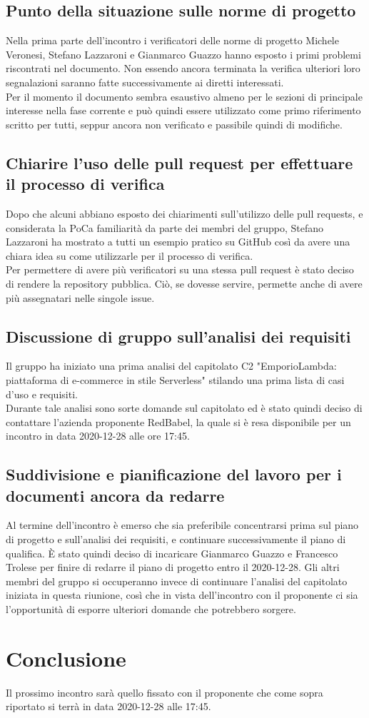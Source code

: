 \subsection{Punto della situazione sulle norme di progetto} 
Nella prima parte dell'incontro i verificatori delle norme di progetto Michele Veronesi, Stefano Lazzaroni e Gianmarco Guazzo hanno esposto i primi problemi riscontrati nel documento. Non essendo ancora terminata la verifica ulteriori loro segnalazioni saranno fatte successivamente ai diretti interessati.\\
Per il momento il documento sembra esaustivo almeno per le sezioni di principale interesse nella fase corrente e può quindi essere utilizzato come primo riferimento scritto per tutti, seppur ancora non verificato e passibile quindi di modifiche.

\subsection{Chiarire l'uso delle pull request per effettuare il processo di verifica}
Dopo che alcuni abbiano esposto dei chiarimenti sull'utilizzo delle pull requests, e considerata la PoCa familiarità da parte dei membri del gruppo, Stefano Lazzaroni ha mostrato a tutti un esempio pratico su GitHub così da avere una chiara idea su come utilizzarle per il processo di verifica.\\
Per permettere di avere più verificatori su una stessa pull request è stato deciso di rendere la repository pubblica. Ciò, se dovesse servire, permette anche di avere più assegnatari nelle singole issue.

\subsection{Discussione di gruppo sull'analisi dei requisiti}
Il gruppo ha iniziato una prima analisi del capitolato C2 "EmporioLambda: piattaforma di e-commerce in stile Serverless" stilando una prima lista di casi d'uso e requisiti.\\
Durante tale analisi sono sorte domande sul capitolato ed è stato quindi deciso di contattare l'azienda proponente RedBabel, la quale si è resa disponibile per un incontro in data 2020-12-28 alle ore 17:45.

\subsection{Suddivisione e pianificazione del lavoro per i documenti ancora da redarre} 
Al termine dell'incontro è emerso che sia preferibile concentrarsi prima sul piano di progetto e sull'analisi dei requisiti, e continuare successivamente il piano di qualifica.
È stato quindi deciso di incaricare Gianmarco Guazzo e Francesco Trolese per finire di redarre il piano di progetto entro il 2020-12-28. Gli altri membri del gruppo si occuperanno invece di continuare l'analisi del capitolato iniziata in questa riunione, così che in vista dell'incontro con il proponente ci sia l'opportunità di esporre ulteriori domande che potrebbero sorgere.

\section{Conclusione}
Il prossimo incontro sarà quello fissato con il proponente che come sopra riportato si terrà in data 2020-12-28 alle 17:45.

